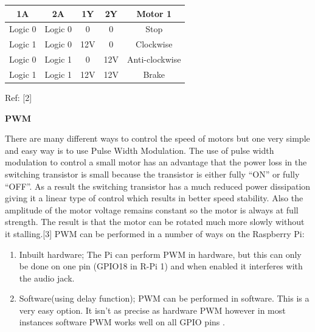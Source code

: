 \documentclass[11pt,a4paper]{article}
\begin{document}
    \vspace{0.5cm}
    \centering
    \begin{tabular}{|c|c|c|c|c|}
    	\hline
    	1A & 2A	& 1Y & 2Y & Motor 1\\
    	\hline
    	Logic 0	& Logic 0 & 0 & 0 & Stop \\
    	\hline
    	Logic 1	& Logic 0 & 12V	& 0	& Clockwise\\
    	\hline
    	Logic 0	& Logic 1 & 0 & 12V	& Anti-clockwise\\
    	\hline
    	Logic 1	& Logic 1 & 12V & 12V & Brake\\
    	\hline
    \end{tabular}
    \centering
    \newline
    Ref: [2]
    
    \newpage
    \flushleft
    \textbf{PWM}
    
    \vspace{0.3cm}
    There are many different ways to control the speed of motors but one very simple and easy way is to use Pulse Width Modulation.
    \vspace{0.3cm}
    The use of pulse width modulation to control a small motor has an advantage that the power loss in the switching transistor is small because the transistor is either fully “ON” or fully “OFF”. As a result the switching transistor has a much reduced power dissipation giving it a linear type of control which results in better speed stability.
    \vspace{0.3cm}
    Also the amplitude of the motor voltage remains constant so the motor is always at full strength. The result is that the motor can be rotated much more slowly without it stalling.[3]
    \newline
    \newline
    PWM can be performed in a number of ways on the Raspberry Pi:
    \begin{enumerate}
    	\item Inbuilt hardware;
    	The Pi can perform PWM in hardware, but this can only be done on one pin (GPIO18 in R-Pi 1) and when enabled it interferes with the audio jack. 
    	
    	\item Software(using delay function);
    	PWM can be performed in software. This is a very easy option. It isn’t as precise as hardware PWM however in most instances software PWM works well on all GPIO pins . 
    \end{enumerate}
    
\end{document}
